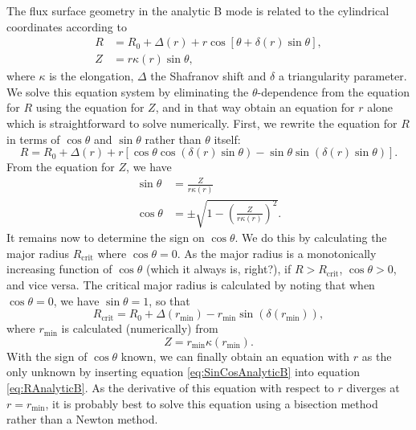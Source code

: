\documentclass{notes}
\begin{document}
    The flux surface geometry in the analytic B mode is related to the cylindrical coordinates according to
    \begin{align}
R &= R_0 + \Delta(r) + r\cos[\theta +\delta(r) \sin\theta], \nonumber \\
Z &= r \kappa(r) \sin\theta,
\label{eq:analyticB system}
\end{align}
where $\kappa$ is the elongation, $\Delta$ the Shafranov shift and $\delta$ a triangularity parameter. We solve this equation system by eliminating the $\theta$-dependence from the equation for $R$ using the equation for $Z$, and in that way obtain an equation for $r$ alone which is straightforward to solve numerically. First, we rewrite the equation for $R$ in terms of $\cos{\theta}$ and $\sin{\theta}$ rather than $\theta$ itself:
	\begin{equation}
		R = R_0 + \Delta (r) + r[\cos{\theta}\cos{(\delta(r)\sin{\theta})} - \sin{\theta}\sin{(\delta(r)\sin{\theta})}].
		\label{eq:RAnalyticB}
	\end{equation}
	From the equation for $Z$, we have
	\begin{align}
		\sin{\theta} &= \frac{Z}{r\kappa(r)}\nonumber \\
		\cos{\theta} &= \pm \sqrt{1-\left(\frac{Z}{r\kappa(r)}\right)^2}.
		\label{eq:SinCosAnalyticB}
	\end{align}
	It remains now to determine the sign on $\cos{\theta}$. We do this by calculating the major radius $R_\mathrm{crit}$ where $\cos{\theta}=0$. As the major radius is a monotonically increasing function of $\cos{\theta}$ {\color{red}(which it always is, right?)}, if $R>R_\mathrm{crit}$, $\cos{\theta}>0$, and vice versa. The critical major radius is calculated by noting that when $\cos{\theta}=0$, we have $\sin{\theta}=1$, so that
	\begin{equation}
		R_\mathrm{crit} = R_0 + \Delta(r_\mathrm{min}) - r_\mathrm{min}\sin{(\delta(r_\mathrm{min}))},
	\end{equation}
	where $r_\mathrm{min}$ is calculated (numerically) from
	\begin{equation}
		Z = r_\mathrm{min}\kappa(r_\mathrm{min}).
	\end{equation}
	With the sign of $\cos{\theta}$ known, we can finally obtain an equation with $r$ as the only unknown by inserting equation \eqref{eq:SinCosAnalyticB} into equation \eqref{eq:RAnalyticB}. As the derivative of this equation with respect to $r$ diverges at $r=r_\mathrm{min}$, it is probably best to solve this equation using a bisection method rather than a Newton method.
	

    
\end{document}
